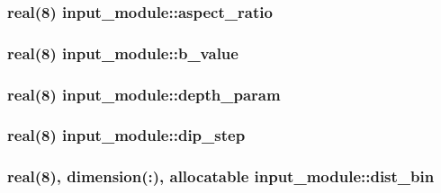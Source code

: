\subsubsection[{aspect\+\_\+ratio}]{\setlength{\rightskip}{0pt plus 5cm}real(8) input\+\_\+module\+::aspect\+\_\+ratio}\label{namespaceinput__module_ab4d6a4549b55a71a3451143893707ad2}
\hypertarget{namespaceinput__module_a44ab6716b820721bceea32b98883fcdd}{}
\subsubsection[{b\+\_\+value}]{\setlength{\rightskip}{0pt plus 5cm}real(8) input\+\_\+module\+::b\+\_\+value}\label{namespaceinput__module_a44ab6716b820721bceea32b98883fcdd}
\hypertarget{namespaceinput__module_af24dc133394110c4b8722a650aa7aab5}{}
\subsubsection[{depth\+\_\+param}]{\setlength{\rightskip}{0pt plus 5cm}real(8) input\+\_\+module\+::depth\+\_\+param}\label{namespaceinput__module_af24dc133394110c4b8722a650aa7aab5}
\hypertarget{namespaceinput__module_a88d165b66edaf4e0dc9efbc76d5334b3}{}
\subsubsection[{dip\+\_\+step}]{\setlength{\rightskip}{0pt plus 5cm}real(8) input\+\_\+module\+::dip\+\_\+step}\label{namespaceinput__module_a88d165b66edaf4e0dc9efbc76d5334b3}
\hypertarget{namespaceinput__module_a760ea371c13a02c658f3ec689a63adad}{}
\subsubsection[{dist\+\_\+bin}]{\setlength{\rightskip}{0pt plus 5cm}real(8), dimension(\+:), allocatable input\+\_\+module\+::dist\+\_\+bin}\label{namespaceinput__module_a760ea371c13a02c658f3ec689a63adad}
\hypertarget{namespaceinput__module_ada333752feb1551085c3d0331da41a6d}{}
